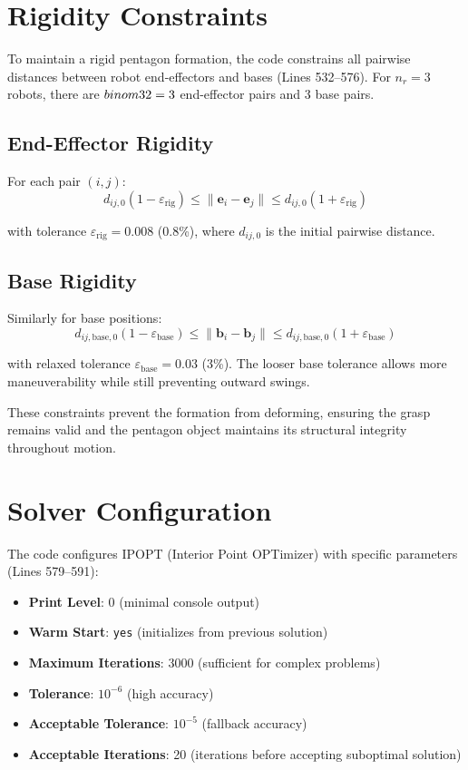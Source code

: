 \documentclass[12pt,a4paper]{article}
\begin{document}
\section{Rigidity Constraints}

To maintain a rigid pentagon formation, the code constrains all pairwise distances between robot end-effectors and bases (Lines 532--576). For $n_r = 3$ robots, there are $\\binom{3}{2} = 3$ end-effector pairs and 3 base pairs.

\subsection{End-Effector Rigidity}
For each pair $(i,j)$:
\[
d_{ij,0}(1 - \varepsilon_{\text{rig}}) \leq \|\mathbf{e}_i - \mathbf{e}_j\| \leq d_{ij,0}(1 + \varepsilon_{\text{rig}})
\]

with tolerance $\varepsilon_{\text{rig}} = 0.008$ (0.8\%), where $d_{ij,0}$ is the initial pairwise distance.

\subsection{Base Rigidity}
Similarly for base positions:
\[
d_{ij,\text{base},0}(1 - \varepsilon_{\text{base}}) \leq \|\mathbf{b}_i - \mathbf{b}_j\| \leq d_{ij,\text{base},0}(1 + \varepsilon_{\text{base}})
\]

with relaxed tolerance $\varepsilon_{\text{base}} = 0.03$ (3\%). The looser base tolerance allows more maneuverability while still preventing outward swings.

These constraints prevent the formation from deforming, ensuring the grasp remains valid and the pentagon object maintains its structural integrity throughout motion.

\section{Solver Configuration}

The code configures IPOPT (Interior Point OPTimizer) with specific parameters (Lines 579--591):

\begin{itemize}
    \item \textbf{Print Level}: 0 (minimal console output)
    \item \textbf{Warm Start}: \texttt{yes} (initializes from previous solution)
    \item \textbf{Maximum Iterations}: 3000 (sufficient for complex problems)
    \item \textbf{Tolerance}: $10^{-6}$ (high accuracy)
    \item \textbf{Acceptable Tolerance}: $10^{-5}$ (fallback accuracy)
    \item \textbf{Acceptable Iterations}: 20 (iterations before accepting suboptimal solution)
\end{itemize}
\end{document}
